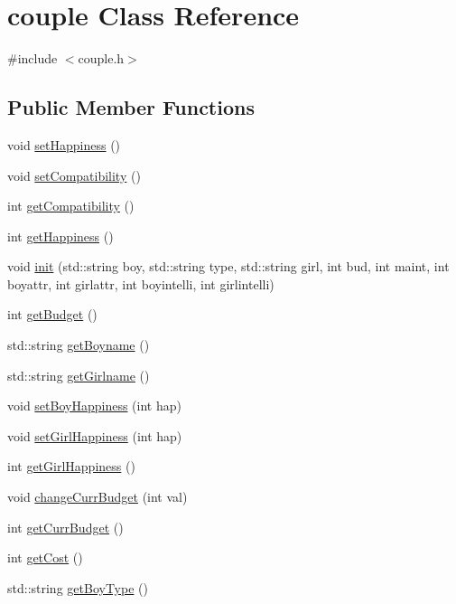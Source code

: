 \hypertarget{classcouple}{}\section{couple Class Reference}
\label{classcouple}


{\ttfamily \#include $<$couple.\+h$>$}

\subsection*{Public Member Functions}
\begin{DoxyCompactItemize}
\item 
void \hyperlink{classcouple_aaaadc39a9f265907581925ef579c7214}{set\+Happiness} ()
\item 
void \hyperlink{classcouple_a91bc77488fe8b5d30643b9ff0a56d359}{set\+Compatibility} ()
\item 
int \hyperlink{classcouple_a43d2852ce692307280ba9ab2366c16eb}{get\+Compatibility} ()
\item 
int \hyperlink{classcouple_a31d0a1c8acff06a64ebc2e2f6d9a68b1}{get\+Happiness} ()
\item 
void \hyperlink{classcouple_a3ee36a530603865ff58470bae84da220}{init} (std\+::string boy, std\+::string type, std\+::string girl, int bud, int maint, int boyattr, int girlattr, int boyintelli, int girlintelli)
\item 
int \hyperlink{classcouple_a92496b42f9d1392013c4d7456318ad70}{get\+Budget} ()
\item 
std\+::string \hyperlink{classcouple_afe07f86e775d20508e6cd139488af366}{get\+Boyname} ()
\item 
std\+::string \hyperlink{classcouple_a7897320b780dbeaa85380c71803de9c2}{get\+Girlname} ()
\item 
void \hyperlink{classcouple_a50a890cb7ffd3a44f0201b8e0d84f744}{set\+Boy\+Happiness} (int hap)
\item 
void \hyperlink{classcouple_a526f48a752f261212d111a630f5730f4}{set\+Girl\+Happiness} (int hap)
\item 
int \hyperlink{classcouple_ada2f9b79cede186a0e9bcd6b48bec804}{get\+Girl\+Happiness} ()
\item 
void \hyperlink{classcouple_afa9889ca750dd53ffd06daf78cbee326}{change\+Curr\+Budget} (int val)
\item 
int \hyperlink{classcouple_af4b090a72111d7ba566747e4e305a6ec}{get\+Curr\+Budget} ()
\item 
int \hyperlink{classcouple_a5f31ac8019f5db29694dc36cdba958b8}{get\+Cost} ()
\item 
std\+::string \hyperlink{classcouple_a687986a266cc984fa5d2114c888f52cf}{get\+Boy\+Type} ()
\end{DoxyCompactItemize}


